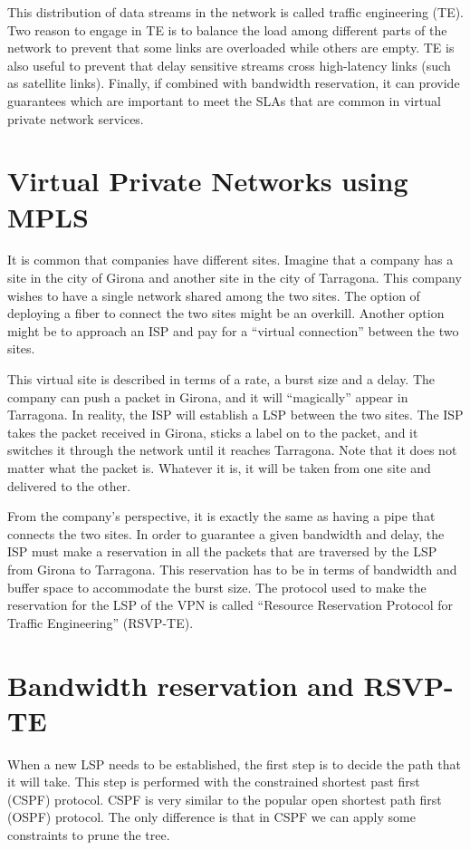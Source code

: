 This distribution of data streams in the network is called traffic engineering (TE).
Two reason to engage in TE is to balance the load among different parts of the network to prevent that some links are overloaded while others are empty.
TE is also useful to prevent that delay sensitive streams cross high-latency links (such as satellite links).
Finally, if combined with bandwidth reservation, it can provide guarantees which are important to meet the SLAs that are common in virtual private network services.

\section{Virtual Private Networks using MPLS}
It is common that companies have different sites.
Imagine that a company has a site in the city of Girona and another site in the city of Tarragona.
This company wishes to have a single network shared among the two sites.
The option of deploying a fiber to connect the two sites might be an overkill.
Another option might be to approach an ISP and pay for a ``virtual connection'' between the two sites.

This virtual site is described in terms of a rate, a burst size and a delay.
The company can push a packet in Girona, and it will ``magically'' appear in Tarragona.
In reality, the ISP will establish a LSP between the two sites.
The ISP takes the packet received in Girona, sticks a label on to the packet, and it switches it through the network until it reaches Tarragona.
Note that it does not matter what the packet is.
Whatever it is, it will be taken from one site and delivered to the other.

From the company's perspective, it is exactly the same as having a pipe that connects the two sites.
In order to guarantee a given bandwidth and delay, the ISP must make a reservation in all the packets that are traversed by the LSP from Girona to Tarragona.
This reservation has to be in terms of bandwidth and buffer space to accommodate the burst size.
The protocol used to make the reservation for the LSP of the VPN is called ``Resource Reservation Protocol for Traffic Engineering'' (RSVP-TE).


\section{Bandwidth reservation and RSVP-TE}
When a new LSP needs to be established, the first step is to decide the path that it will take.
This step is performed with the constrained shortest past first (CSPF) protocol.
CSPF is very similar to the popular open shortest path first (OSPF) protocol.
The only difference is that in CSPF we can apply some constraints to prune the tree.

